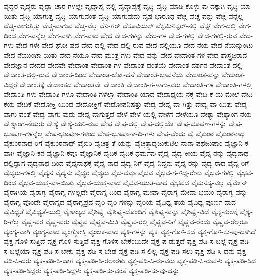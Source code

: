 {ವೃದ್ಧರ
ವೃದ್ಧರು
ವೃದ್ಧಾ-ಚಾರ-ಗಳಲ್ಲೇ
ವೃದ್ಧಾಪ್ಯ-ದಲ್ಲಿ
ವೃದ್ಧಾಪ್ಯಕ್ಕೆ
ವೃದ್ಧಿ
ವೃದ್ಧಿ-ಮಾಡಿ-ಕೊಳ್ಳು-ವು-ದಕ್ಕಾಗಿ
ವೃದ್ಧಿ-ಯಾ-ಯಿತು
ವೃದ್ಧಿ-ಯಾಗುತ್ತ
ವೃದ್ಧಿ-ಯಾಗುವಂತೆ
ವೃದ್ಧಿ-ಯಾಗುವುದು
ವೃಷ-ಭಾರೂಢ
ವೆಚ್ಚ
ವೆಚ್ಚ-ವನ್ನು
ವೆಚ್ಚ-ವನ್ನೆಲ್ಲ
ವೆಚ್ಚ-ವಾಗುತ್ತಿತ್ತು
ವೆಚ್ಚ-ವಾಗುವ
ವೆಚ್ಚ-ವೆಲ್ಲ
ವೆನಿ-ಗರ್
ವೆಸೂವಿಯಸ್
ವೆಸ್ಟಮಿನಿಸ್ಟರ್-ನಲ್ಲಿ
ವೆಸ್ಟ್
ವೇಗ-ದಲ್ಲಿ
ವೇಗ-ದಿಂದ
ವೇಗ-ವನ್ನೆಲ್ಲ
ವೇಗ-ವಾಗಿ
ವೇಗ-ವಾದ
ವೇದ
ವೇದ-ಗಳನ್ನು
ವೇದ-ಗಳ
ವೇದ-ಗಳಲ್ಲಿ
ವೇದ-ಗಳಲ್ಲಿ-ರುವ
ವೇದ-ಗಳು
ವೇದ-ಗಳೇ
ವೇದ-ಘೋ-ಷದ
ವೇದ-ದಲ್ಲಿ
ವೇದ-ದಲ್ಲಿ-ರುವ
ವೇದ-ದಲ್ಲಿಯೂ
ವೇದ-ನೆಯ
ವೇದ-ನೆಯನ್ನುಂಟು
ವೇದ-ನೆಯುಂಟಾ-ಯಿತು
ವೇದ-ನೆಯೂ
ವೇದ-ಮಂತ್ರ-ಗಳು
ವೇದ-ವನ್ನು
ವೇದ-ವೇದಾಂತ-ಗಳ
ವೇದ-ಶಾಸ್ತ್ರಜ್ಞರಾದ
ವೇದಜ್ಞಾನ
ವೇದದ
ವೇದವೇ
ವೇದಾಂತ
ವೇದಾಂತ-ಗಳ
ವೇದಾಂತ-ದಂತೆಯೆ
ವೇದಾಂತ-ದರ್ಶನ
ವೇದಾಂತ-ದಲ್ಲಿ
ವೇದಾಂತ-ದಲ್ಲಿ-ರುವ
ವೇದಾಂತ-ದಿಂದ
ವೇದಾಂತ-ಬೋ-ಧನೆ
ವೇದಾಂತ-ಭಾವನೆಯ
ವೇದಾಂತ-ವನ್ನು
ವೇದಾಂತ-ವಿದ್ದರೆ
ವೇದಾಂತಕ್ಕೆ
ವೇದಾಂತದ
ವೇದಾಂತವೇ
ವೇದಾಂತಿ
ವೇದಾಂತಿ-ಗ-ಳಾಗು-ವರು
ವೇದಾಂತಿ-ಗಳ
ವೇದಾಂತಿ-ಗಳಲ್ಲಿ
ವೇದಾಂತಿ-ಗಳು
ವೇದಾಂತಿ-ಗಳೂ
ವೇದಾಂತಿ-ಗಳೆಲ್ಲಾ
ವೇದಾಂತಿ-ಯಾದ
ವೇದಾಧ್ಯಯ-ನಕ್ಕೆ
ವೇದಿ-ಕೆ-ಯ-ಮೇಲೆ
ವೇದಿ-ಕೆಯ
ವೇದಿಕೆ
ವೇದೋಕ್ತಿ-ಯಿಂದ
ವೇದೋಕ್ತಿಗೆ
ವೇದೋಪನಿಷತ್ತು
ವೇದ್ಯ
ವೇದ್ಯ-ವಾ-ಗಿತ್ತು
ವೇದ್ಯ-ವಾ-ಯಿತು
ವೇದ್ಯ-ವಾಗು-ವಂತೆ
ವೇದ್ಯ-ವಾಗು-ವುದು
ವೇದ್ಯ-ವಾಗುತ್ತದೆ
ವೇಳೆ
ವೇಳೆ-ಯಲ್ಲಿ
ವೇಳೆಗೆ
ವೇಳೆಯೂ
ವೇಶ್ಯಾ
ವೇಶ್ಯಾಂಗ-ನೆಯ
ವೇಶ್ಯಾಂಗ-ನೆಯರು
ವೇಶ್ಯೆ
ವೇಶ್ಯೆ-ಯರಿ-ರುವ
ವೇಷ
ವೇಷ-ದಲ್ಲಿ
ವೇಷ-ದಲ್ಲಿಯೇ
ವೇಷ-ಭೂಷಣ-ಗಳನ್ನು
ವೇಷ-ಭೂಷಣ-ಗಳನ್ನೆಲ್ಲ
ವೇಷ-ಭೂಷಣ-ಗಳಿಂದ
ವೇಷ-ಭೂಷಾಣಾ-ದಿ-ಗಳು
ವೇಷ-ವೆಂದು
ವೈ
ವೈಕುಂಠ
ವೈಕುಂಠನಾಥ
ವೈಕುಂಠನಾಥ-ರಿಗೆ
ವೈಕುಂಠನಾಥ್
ವೈಖರಿ
ವೈಚಿತ್ರ-ತೆ-ಯನ್ನು
ವೈಚಿತ್ರ್ಯಾದೃಜುಕುಟಿಲ-ನಾನಾ-ಪಥಜುಷಾಂ
ವೈಜ್ಞಾನಿ-ಕ-ವಾಗಿ
ವೈಜ್ಞಾನಿ-ಕನ
ವೈಜ್ಞಾನಿ-ಕವೂ
ವೈಜ್ಞಾನಿಕ
ವೈದಿಕ
ವೈದಿಕ-ಧರ್ಮವು
ವೈದ್ಯ
ವೈದ್ಯ-ಕೀಯ
ವೈದ್ಯ-ನನ್ನು
ವೈದ್ಯನಾಥ-ದಲ್ಲಿದ್ದಾಗ
ವೈದ್ಯನಾಥ-ದಿಂದ
ವೈದ್ಯನಾಥಕ್ಕೆ
ವೈದ್ಯ-ನಾದ
ವೈದ್ಯ-ನಿಗೆ
ವೈದ್ಯ-ನಿದ್ದನು
ವೈದ್ಯ-ರನ್ನು
ವೈದ್ಯ-ರಾದ
ವೈದ್ಯ-ರಿಗೆ
ವೈದ್ಯರು-ಗಳಲ್ಲಿ
ವೈದ್ಯನ
ವೈದ್ಯನು
ವೈದ್ಯರ
ವೈದ್ಯರು
ವೈಭ-ವವೂ
ವೈಭವ
ವೈಭವ-ಗ-ಳಿದ್ದ-ರೇನು
ವೈಭವ-ಗಳಲ್ಲಿ
ವೈಭವ-ದಿಂದ
ವೈಭವ-ಯುಕ್ತ-ವಾ-ಯಿತು
ವೈಭವ-ಯುಕ್ತ-ವಾದ
ವೈಭವ-ಯುತ-ವಾದ
ವೈಭವದ
ವೈಮನಸ್ಯ-ವಲ್ಲ
ವೈಮೇನ್
ವೈರಾಗಿಯ
ವೈರಾಗ್ಯ
ವೈರಾಗ್ಯ-ಗಳಲ್ಲದೇ
ವೈರಾಗ್ಯ-ದಿಂದ
ವೈರಾಗ್ಯ-ಮೇವಾ
ವೈರಾಗ್ಯ-ಮೇವಾ-ಭಯಂ
ವೈರಾಗ್ಯ-ವನ್ನು
ವೈರಾಗ್ಯ-ವೊಂದೇ
ವೈರಾಗ್ಯದ
ವೈರಾಗ್ಯಪ್ರದ
ವೈರಿ
ವೈರಿ-ಗಳನ್ನು
ವೈರಿಯ
ವೈವಿಧ್ಯ-ತೆಯ
ವೈವಿಧ್ಯ-ಪೂರ್ಣ-ವಾದ
ವೈವಿಧ್ಯತೆ
ವೈವಿಧ್ಯತೆ-ಯಲ್ಲಿ
ವೈಶಾಲ್ಯದ
ವೈಶಿಷ್ಟ್ಯ
ವೈಶಿಷ್ಟ್ಯ-ದೊಂದಿಗೆ
ವೈಶಿಷ್ಟ್ಯ-ವನ್ನು
ವೈಶಿಷ್ಟ್ಯ-ವಿದೆ
ವೈಶ್ಯ-ಕುಲಕ್ಕೆ
ವೈಶ್ಯ-ರಿ-ಗೆಲ್ಲ
ವೈಷ್ಣ-ವರ
ವೈಷ್ಣ-ವರು
ವೈಷ್ಣವ
ವೈಷ್ಣವ-ಮಿತಿ
ವೈಷ್ಣವ-ರಲ್ಲಿ
ವೈಷ್ಣವ-ರಿಗೆ
ವೈಷ್ಣವ-ರೆಂದು
ವೈಷ್ಣವ-ರೆಲ್ಲರೂ
ವ್ಯಂಗ್ಯ-ವಾಗಿ
ವ್ಯಂಗ್ಯ-ವಾದ
ವ್ಯಂಗ್ಯೋಕ್ತಿ
ವ್ಯಂಜಕ-ವಾದ
ವ್ಯಕಿ-ಗಳನ್ನು
ವ್ಯಕ್ತ
ವ್ಯಕ್ತ-ಗೊಳಿ-ಸದೆ
ವ್ಯಕ್ತ-ಗೊಳಿ-ಸು-ವು-ದಾಗಿದೆ
ವ್ಯಕ್ತ-ಗೊಳಿ-ಸುತ್ತಿದೆ
ವ್ಯಕ್ತ-ಗೊಳಿ-ಸುತ್ತಿವೆ
ವ್ಯಕ್ತ-ಗೊಳಿಸ-ಬೇಕೆಂಬುದೇ
ವ್ಯಕ್ತ-ಪ-ಡುತ್ತದೆ
ವ್ಯಕ್ತ-ಪಡಿ-ಸ-ಬಲ್ಲೆ
ವ್ಯಕ್ತ-ಪಡಿ-ಸ-ಬಲ್ಲೆಯಾ
ವ್ಯಕ್ತ-ಪಡಿ-ಸ-ಬೇಕು
ವ್ಯಕ್ತ-ಪಡಿ-ಸ-ಬೇಡ
ವ್ಯಕ್ತ-ಪಡಿ-ಸ-ಲಿಲ್ಲ
ವ್ಯಕ್ತ-ಪಡಿ-ಸಲು
ವ್ಯಕ್ತ-ಪಡಿ-ಸಿ-ದನು
ವ್ಯಕ್ತ-ಪಡಿ-ಸಿ-ದರು
ವ್ಯಕ್ತ-ಪಡಿ-ಸಿ-ದಾಗ
ವ್ಯಕ್ತ-ಪಡಿ-ಸಿ-ರಲಾರಳು
ವ್ಯಕ್ತ-ಪಡಿ-ಸಿ-ರು-ವರು
ವ್ಯಕ್ತ-ಪಡಿ-ಸಿ-ರುವಳು
ವ್ಯಕ್ತ-ಪಡಿ-ಸಿದ
ವ್ಯಕ್ತ-ಪಡಿ-ಸಿದ್ದರು
ವ್ಯಕ್ತ-ಪಡಿ-ಸಿದ್ದಳು
ವ್ಯಕ್ತ-ಪಡಿ-ಸು-ವಂತೆ
ವ್ಯಕ್ತ-ಪಡಿ-ಸು-ವು-ದನ್ನು
}

